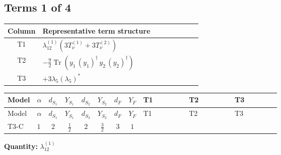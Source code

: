 \documentclass[8pt]{article}
\begin{document}
\begin{landscape}
\subsection*{Terms 1 of 4}
\begin{center}
\begin{tabular}{@{}c >{\raggedright\arraybackslash}p{0.82\linewidth}@{}}
\toprule
Column & Representative term structure \\
\midrule
T1 & \(\displaystyle {\lambda_{12}^{(1)}} (3 T_{\nu}^{(1)}+3 T_{\nu}^{(2)})\) \\
\midrule
T2 & \(\displaystyle -\frac{9}{2} \operatorname{Tr}\!\left({y_1}\,\left({y_1}\right)^{\dagger}\,{y_2}\,\left({y_2}\right)^{\dagger}\right)\) \\
\midrule
T3 & \(\displaystyle +3 {\lambda_5} \left({\lambda_5}\right)^{*}\) \\
\midrule
\bottomrule
\end{tabular}
\end{center}
\smallskip
\tiny
\begin{longtable}{@{}llcccccc >{\raggedright\arraybackslash}p{0.21\linewidth} >{\raggedright\arraybackslash}p{0.21\linewidth} >{\raggedright\arraybackslash}p{0.21\linewidth}@{}}
\toprule
Model & $\alpha$ & $d_{S_1}$ & $Y_{S_1}$ & $d_{S_2}$ & $Y_{S_2}$ & $d_F$ & $Y_F$ & T1 & T2 & T3 \\
\midrule
\endfirsthead
\toprule
Model & $\alpha$ & $d_{S_1}$ & $Y_{S_1}$ & $d_{S_2}$ & $Y_{S_2}$ & $d_F$ & $Y_F$ & T1 & T2 & T3 \\
\midrule
\endhead
T3-C & $1$ & $2$ & $\frac{1}{2}$ & $2$ & $\frac{3}{2}$ & $3$ & $1$ & \scriptsize\adjustbox{max width=\linewidth}{$\begin{gathered} {\lambda_{12}^{(1)}} (3 T_{\nu}^{(1)}+3 T_{\nu}^{(2)})\end{gathered}$} & \scriptsize\adjustbox{max width=\linewidth}{$\begin{gathered} -\frac{9}{2} \operatorname{Tr}\!\left({y_1}\,\left({y_1}\right)^{\dagger}\,{y_2}\,\left({y_2}\right)^{\dagger}\right)\end{gathered}$} & \scriptsize\adjustbox{max width=\linewidth}{$\begin{gathered} +3 {\lambda_5} \left({\lambda_5}\right)^{*}\end{gathered}$} \\
\midrule
\bottomrule
\end{longtable}
\clearpage
\noindent\textbf{Quantity: }$\lambda_{12}^{(1)}$\par\smallskip

\end{landscape}
\end{document}
